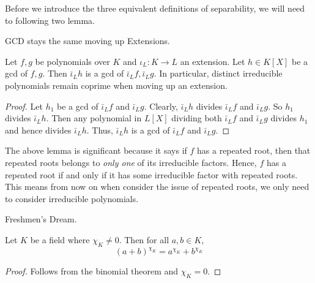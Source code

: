 \documentclass[../book.tex]{subfiles}
\begin{document}
Before we introduce the three equivalent definitions of separability, 
we will need to following two lemma. 
\begin{lem} GCD stays the same moving up Extensions.
    
    Let $f, g$ be polynomials over $K$ and $\iota_L : K \to L$ an extension.
    Let $h \in K[X]$ be a gcd of $f, g$. 
    Then $\bar\iota_L h$ is a gcd of $\bar\iota_L f, \bar\iota_L g$. 
    In particular, distinct irreducible polynomials remain coprime 
    when moving up an extension. 
\end{lem}
\begin{proof}
    Let $h_1$ be a gcd of $\bar\iota_L f$ and $\bar\iota_L g$. 
    Clearly, $\bar\iota_L h$ divides $\bar\iota_L f$ and $\bar\iota_L g$. 
    So $h_1$ divides $\bar\iota_L h$. 
    Then any polynomial in $L[X]$ dividing both $\bar\iota_L f$ and $\bar\iota_L g$
    divides $h_1$ and hence divides $\bar\iota_L h$. 
    Thus, $\bar\iota_L h$ is a gcd of $\bar\iota_L f$ and $\bar\iota_L g$. 
\end{proof}
\begin{rmk}
    The above lemma is significant because it says
    if $f$ has a repeated root, then that repeated roots belongs to 
    \emph{only one} of its irreducible factors. 
    Hence, $f$ has a repeated root if and only if it has some irreducible factor
    with repeated roots. 
    This means from now on when consider the issue of repeated roots, 
    we only need to consider irreducible polynomials. 
\end{rmk}
\begin{lem} Freshmen's Dream.
    
    Let $K$ be a field where $\chi_K \neq 0$. 
    Then for all $a, b \in K$, \[
        (a+b)^{\chi_K} = a^{\chi_K} + b^{\chi_K}
    \]
\end{lem}
\begin{proof}
    Follows from the binomial theorem and $\chi_K = 0$. 
\end{proof}
\end{document}

